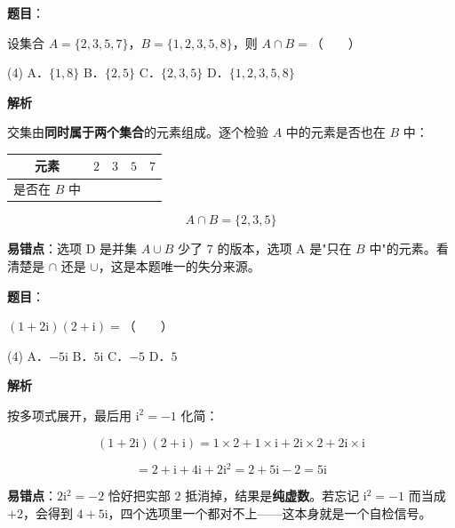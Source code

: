 \begin{answer}

\textbf{题目}：

设集合 $A=\{2,3,5,7\}$，$B=\{1,2,3,5,8\}$，则 $A\cap B=$\mbox{（　　）}

\begin{gkopts}(4)
\task A．$\{1,8\}$
\task B．$\{2,5\}$
\task C．$\{2,3,5\}$
\task D．$\{1,2,3,5,8\}$
\end{gkopts}

\textbf{解析}

交集由\textbf{同时属于两个集合}的元素组成。逐个检验 $A$ 中的元素是否也在 $B$ 中：

\begin{center}
\begin{tabular}{ccccc}
\toprule
元素 & $2$ & $3$ & $5$ & $7$ \\
\midrule
是否在 $B$ 中 &  &  &  &  \\
\bottomrule
\end{tabular}
\end{center}

\nopagebreak[4]
\[A\cap B=\{2,3,5\}\]

\begin{gktip}
\textbf{易错点}：选项 D 是并集 $A\cup B$ 少了 $7$ 的版本，选项 A 是"只在 $B$ 中"的元素。看清楚是 $\cap$ 还是 $\cup$，这是本题唯一的失分来源。
\end{gktip}


\par\medskip

\end{answer}
\begin{answer}

\textbf{题目}：

$(1+2\mathrm i)(2+\mathrm i)=$\mbox{（　　）}

\begin{gkopts}(4)
\task A．$-5\mathrm i$
\task B．$5\mathrm i$
\task C．$-5$
\task D．$5$
\end{gkopts}

\textbf{解析}

按多项式展开，最后用 $\mathrm i^{2}=-1$ 化简：

\nopagebreak[4]
\[(1+2\mathrm i)(2+\mathrm i)=1\times2+1\times\mathrm i+2\mathrm i\times2+2\mathrm i\times\mathrm i\]

\nopagebreak[4]
\[=2+\mathrm i+4\mathrm i+2\mathrm i^{2}=2+5\mathrm i-2=5\mathrm i\]

\begin{gktip}
\textbf{易错点}：$2\mathrm i^{2}=-2$ 恰好把实部 $2$ 抵消掉，结果是\textbf{纯虚数}。若忘记 $\mathrm i^{2}=-1$ 而当成 $+2$，会得到 $4+5\mathrm i$，四个选项里一个都对不上——这本身就是一个自检信号。
\end{gktip}


\par\medskip

\end{answer}
